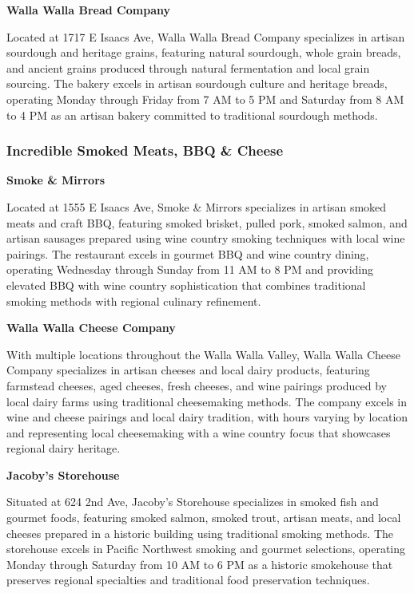 \documentclass[
  11pt,
  letterpaper,
  DIV=10,
  numbers=noendperiod]{scrartcl}
\begin{document}
\textbf{Walla Walla Bread Company}

Located at 1717 E Isaacs Ave, Walla Walla Bread Company specializes in
artisan sourdough and heritage grains, featuring natural sourdough,
whole grain breads, and ancient grains produced through natural
fermentation and local grain sourcing. The bakery excels in artisan
sourdough culture and heritage breads, operating Monday through Friday
from 7 AM to 5 PM and Saturday from 8 AM to 4 PM as an artisan bakery
committed to traditional sourdough methods.

\subsubsection{Incredible Smoked Meats, BBQ \&
Cheese}\label{incredible-smoked-meats-bbq-cheese-3}

\textbf{Smoke \& Mirrors}

Located at 1555 E Isaacs Ave, Smoke \& Mirrors specializes in artisan
smoked meats and craft BBQ, featuring smoked brisket, pulled pork,
smoked salmon, and artisan sausages prepared using wine country smoking
techniques with local wine pairings. The restaurant excels in gourmet
BBQ and wine country dining, operating Wednesday through Sunday from 11
AM to 8 PM and providing elevated BBQ with wine country sophistication
that combines traditional smoking methods with regional culinary
refinement.

\textbf{Walla Walla Cheese Company}

With multiple locations throughout the Walla Walla Valley, Walla Walla
Cheese Company specializes in artisan cheeses and local dairy products,
featuring farmstead cheeses, aged cheeses, fresh cheeses, and wine
pairings produced by local dairy farms using traditional cheesemaking
methods. The company excels in wine and cheese pairings and local dairy
tradition, with hours varying by location and representing local
cheesemaking with a wine country focus that showcases regional dairy
heritage.

\textbf{Jacoby's Storehouse}

Situated at 624 2nd Ave, Jacoby's Storehouse specializes in smoked fish
and gourmet foods, featuring smoked salmon, smoked trout, artisan meats,
and local cheeses prepared in a historic building using traditional
smoking methods. The storehouse excels in Pacific Northwest smoking and
gourmet selections, operating Monday through Saturday from 10 AM to 6 PM
as a historic smokehouse that preserves regional specialties and
traditional food preservation techniques.
\end{document}
